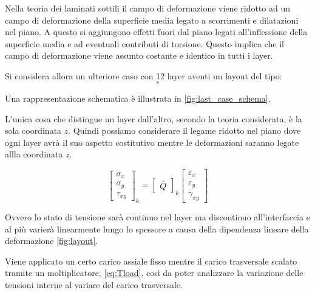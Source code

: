 \documentclass[a4paper,num-refs]{oup-contemporary}
\begin{document}
Nella teoria dei laminati sottili il campo di deformazione viene ridotto ad un campo di deformazione della superficie media legato a scorrimenti e dilatazioni nel piano. A questo si aggiungono effetti fuori dal piano legati all'inflessione della superficie media e ad eventuali contributi di torsione. Questo implica che il campo di deformazione viene assunto costante e identico in tutti i layer.

Si considera allora un ulteriore caso con 12 layer aventi un layout del tipo:
\begin{equation}
	[10 /-10 / 30 /-30 / 0_2]_{\mathrm{s}}
\end{equation}

Una rappresentazione schematica è illustrata in \cref{fig:last_case_schema}. 

L'unica cosa che distingue un layer dall'altro, secondo la teoria considerata, è la sola coordinata $z$. Quindi possiamo considerare il legame ridotto nel piano dove ogni layer avrà  il suo aspetto costitutivo mentre le deformazioni saranno legate allla coordinata $z$. 

\begin{equation}
	\begin{bmatrix}
		\sigma_x\\ \sigma_y\\ \tau_{xy}
	\end{bmatrix}_k=
\begin{bmatrix}
	\bar Q
\end{bmatrix}_k \begin{bmatrix} \varepsilon_x\\ \varepsilon_y\\ \gamma_{xy} \end{bmatrix}
\label{eq:QQ}
\end{equation}

Ovvero lo stato di tensione sarà continuo nel layer ma discontinuo all'interfaccia e al più varierà linearmente lungo lo spessore a causa della dipendenza lineare della deformazione \cref{fig:layout}.

Viene applicato un certo carico assiale fisso mentre il carico trasversale scalato tramite un moltiplicatore, \cref{eq:Tload}, così da poter analizzare la variazione delle tensioni interne al variare del carico trasversale. 
\end{document}

